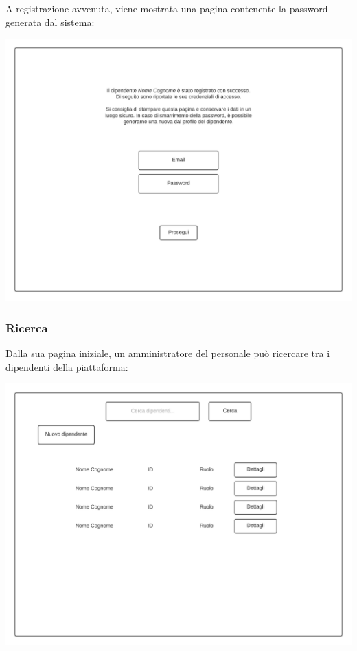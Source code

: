 \documentclass[12pt]{article}
\begin{document}
\newpage

A registrazione avvenuta, viene mostrata una pagina contenente la password generata dal sistema:

\begin{center}
\includegraphics[height=0.3\textheight]{Mockup/AmministratorePersonale/EsitoRegistrazione}
\end{center}


\subsubsection{Ricerca}
Dalla sua pagina iniziale, un amministratore del personale può ricercare tra i dipendenti della piattaforma:

\begin{center}
\includegraphics[height=0.3\textheight]{Mockup/AmministratorePersonale/Ricerca}
\end{center}
\end{document}

